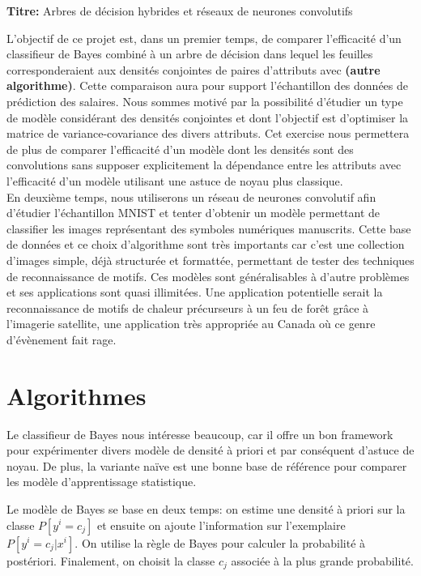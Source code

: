 \documentclass[12pt,letterpaper]{article}
\begin{document}
\textbf{Titre:} Arbres de décision hybrides et réseaux de neurones convolutifs

\abstract

L'objectif de ce projet est, dans un premier temps, de comparer l'efficacité
d'un classifieur de Bayes combiné à un arbre de décision dans lequel les
feuilles corresponderaient aux densités conjointes de paires d'attributs avec
\textbf{(autre algorithme)}. Cette comparaison aura pour support l'échantillon des
données de prédiction des salaires. Nous sommes motivé par la possibilité d'étudier
un type de modèle considérant des densités conjointes et dont l'objectif est
d'optimiser la matrice de variance-covariance des divers attributs. Cet exercise
nous permettera de plus de comparer l'efficacité d'un modèle dont les densités
sont des convolutions sans supposer explicitement la dépendance entre les
attributs avec l'efficacité d'un modèle utilisant une astuce de noyau plus classique. \\

En deuxième temps, nous utiliserons un réseau de neurones convolutif afin
d'étudier l'échantillon MNIST et tenter d'obtenir un modèle permettant de
classifier les images représentant des symboles numériques manuscrits. Cette
base de données et ce choix d'algorithme sont très importants car c'est une
collection d'images simple, déjà structurée et formattée, permettant de tester
des techniques de reconnaissance de motifs. Ces modèles sont généralisables à
d'autre problèmes et ses applications sont quasi illimitées. Une application
potentielle serait la reconnaissance de motifs de chaleur précurseurs à un feu
de forêt grâce à l'imagerie satellite, une application très appropriée au
Canada où ce genre d'évènement fait rage. \\


\section{Algorithmes}

Le classifieur de Bayes nous intéresse beaucoup, car il offre un bon framework
pour expérimenter divers modèle de densité à priori et par conséquent d'astuce
de noyau. De plus, la variante naïve est une bonne base de référence pour
comparer les modèle d'apprentissage statistique.

Le modèle de Bayes se base en deux temps: on estime une densité à priori sur la
classe $P[y^i = c_j]$ et ensuite on ajoute l'information sur l'exemplaire
$P[y^i = c_j | x^i]$. On utilise la règle de Bayes pour calculer la probabilité
à postériori. Finalement, on choisit la classe $c_j$ associée à la plus grande
probabilité.  \\
\end{document}
